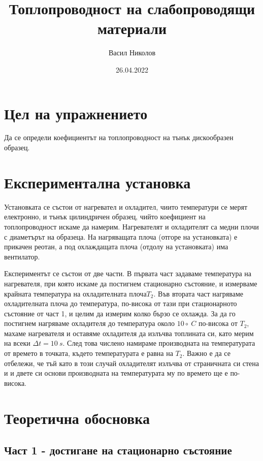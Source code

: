 \documentclass[reprint,amsmath,amssymb,aps]{revtex4-2}
\begin{document}
\setlength{\abovedisplayskip}{3pt}
\setlength{\belowdisplayskip}{3pt}    

\title{Топлопроводност на слабопроводящи материали}

\author{Васил Николов}
\date{26.04.2022}
\maketitle


\section{Цел на упражнението}

Да се определи коефициентът на топлопроводност на тънък дискообразен образец. 


\section{Експериментална установка}

Установката се състои от нагревател и охладител, чиито температури се мерят електронно, и тънък цилиндричен образец, чийто коефициент на топлопроводност искаме да намерим. Нагревателят и охладителят са медни плочи с диаметърът на образеца. На нагряващата плоча (отгоре на установката) е прикачен реотан, а под охлаждащата плоча (отдолу на установката) има вентилатор. 

Експериментът се състои от две части. В първата част задаваме температура на нагревателя, при която искаме да постигнем стационарно състояние, и измерваме крайната температура на охладителната плоча$T_2$. Във втората част нагряваме охладителната плоча до температура, по-висока от тази при стационарното състояние от част 1, и целим да измерим колко бързо се охлажда. За да го постигнем нагряваме охладителя до температура около $10\circ \ C$ по-висока от $T_2$, махаме нагревателя и оставяме охладителя да излъчва топлината си, като мерим на всеки $\Delta t = 10 \ \si{s}$. След това числено намираме производната на температурата от времето в точката, където температурата е равна на $T_2$. Важно е да се отбележи, че тъй като в този случай охладителят излъчва от страничната си стена и и двете си основи производната на температурата му по времето ще е по-висока. 


\section{Теоретична обосновка}
\subsection{Част 1 - достигане на стационарно състояние}
\end{document}

